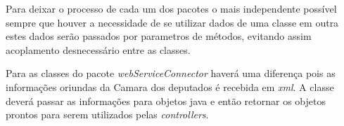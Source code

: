 Para deixar o processo de cada um dos pacotes o mais independente possível sempre que houver a necessidade de se utilizar dados de uma classe em outra estes dados serão passados por parametros de métodos, evitando assim acoplamento desnecessário entre as classes.

Para as classes do pacote \textit{webServiceConnector} haverá uma diferença pois as informações oriundas da Camara dos deputados é recebida em \textit{xml}. A classe deverá passar as informações para objetos java e então retornar os objetos prontos para serem utilizados pelas \textit{controllers}.